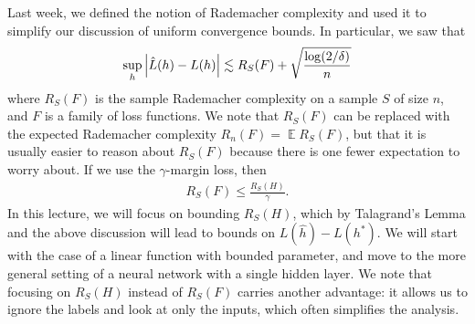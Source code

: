\documentclass[11pt]{article}
\DeclareMathOperator*{\E}{\mathbb E}
\begin{document}
Last week, we defined the notion of Rademacher complexity and used it to simplify our discussion of uniform convergence bounds. In particular, we saw that 
\begin{align}
\sup_h \abs{\hat L(h) - L(h)} \lesssim R_S(F) + \sqrt{\frac{\log(2/\delta)}{n}}
\end{align}
where $R_S(F)$ is the sample Rademacher complexity on a sample $S$ of size $n$, and $F$ is a family of loss functions. We note that $R_S(F)$ can be replaced with the expected Rademacher complexity $R_n(F) = \E R_S(F)$, but that it is usually easier to reason about $R_S(F)$ because there is one fewer expectation to worry about.  If we use the $\gamma$-margin loss, then 
\begin{align}
R_S(F) \le \frac{R_S(H)}{\gamma}.
\end{align}
In this lecture, we will focus on bounding $R_S(H)$, which by Talagrand's Lemma and the above discussion will lead to bounds on $L(\hat h) - L(h^*)$. We will start with the case of a linear function with bounded parameter, and move to the more general setting of a neural network with a single hidden layer. We note that focusing on $R_S(H)$ instead of $R_S(F)$ carries another advantage: it allows us to ignore the labels and look at only the inputs, which often simplifies the analysis.
\end{document}
